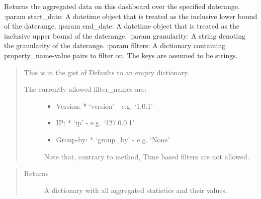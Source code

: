 \documentclass[letterpaper,10pt,english]{sphinxmanual}
\begin{document}
\begin{fulllineitems}
\begin{fulllineitems}
\end{fulllineitems}


\begin{fulllineitems}
\label{\detokenize{pydash_app.dashboard.entity:pydash_app.dashboard.entity.Dashboard.aggregated_data_daterange}}
Returns the aggregated data on this dashboard over the specified daterange.
:param start\_date: A datetime object that is treated as the inclusive lower bound of the daterange.
:param end\_date: A datetime object that is treated as the inclusive upper bound of the daterange.
:param granularity: A string denoting the granularity of the daterange.
:param filters: A dictionary containing property\_name-value pairs to filter on. The keys are assumed to be strings.
\begin{quote}

This is in the gist of 
Defaults to an empty dictionary.
\begin{description}
\item[{The currently allowed filter\_names are:}] \leavevmode\begin{itemize}
\item {} 
Version:
* ‘version’ - e.g. ‘1.0.1’

\item {} 
IP:
* ‘ip’ - e.g. ‘127.0.0.1’

\item {} 
Group-by:
* ‘group\_by’ - e.g. ‘None’

\end{itemize}

Note that, contrary to  method, Time based filters are not allowed.

\end{description}
\end{quote}
\begin{quote}\begin{description}
\item[{Returns}] \leavevmode
A dictionary with all aggregated statistics and their values.

\end{description}\end{quote}


\end{fulllineitems}
\end{fulllineitems}
\end{document}
